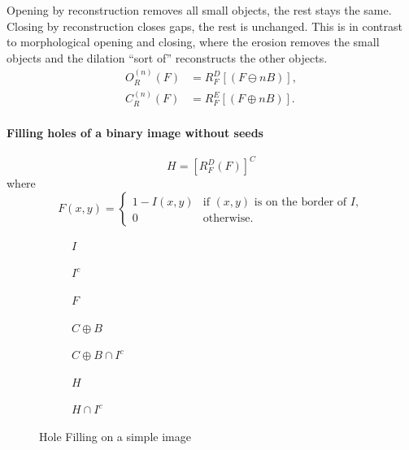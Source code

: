 Opening by reconstruction removes all small objects, the rest stays the same. Closing by reconstruction closes gaps, the rest is unchanged. This is in contrast to morphological opening and closing, where the erosion removes the small objects and the dilation ``sort of'' reconstructs the other objects.
\begin{align*}
	O_R^{(n)}(F) &= R_F^D[(F\ominus nB)], \\
	C_R^{(n)}(F) &= R_F^E[(F\oplus nB)].
\end{align*}

\paragraph{Filling holes of a binary image without seeds}
\[
	H = [R_F^D(F)]^C 
\]
where
\[
	F(x,y) = \begin{cases}
		1-I(x,y) & \text{if $(x,y)$ is on the border of $I$}, \\
		0 & \text{otherwise}.
	\end{cases}
\]

\begin{figure}[h!]
	\centering
	\begin{subfigure}{.25\linewidth}
		\centering
		\caption{$I$}
	\end{subfigure}
	\begin{subfigure}{.25\linewidth}
		\centering
		\caption{$I^c$}
	\end{subfigure}
	\begin{subfigure}{.25\linewidth}
		\centering
		\caption{$F$}
	\end{subfigure}
	\begin{subfigure}{.25\linewidth}
		\centering
		\caption{$C \oplus B$}
	\end{subfigure}
	\begin{subfigure}{.25\linewidth}
		\centering
		\caption{$C \oplus B \cap I^c$}
	\end{subfigure}
	\begin{subfigure}{.25\linewidth}
		\centering
		\caption{$H$}
	\end{subfigure}
	\begin{subfigure}{.25\linewidth}
		\centering
		\caption{$H \cap I^c$}
	\end{subfigure}
	\caption{Hole Filling on a simple image}
\end{figure}


